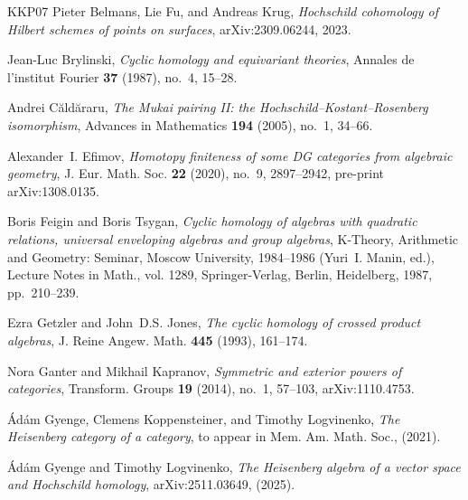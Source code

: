 \documentclass[12pt,a4paper,reqno]{amsart}
\begin{document}
\begin{thebibliography}{KKP07}
Pieter Belmans, Lie Fu, and Andreas Krug, \emph{Hochschild cohomology of
  {H}ilbert schemes of points on surfaces}, arXiv:2309.06244, 2023.

Jean-Luc Brylinski, \emph{Cyclic homology and equivariant theories}, Annales de
  l'institut Fourier \textbf{37} (1987), no.~4, 15--28.

Andrei Căldăraru, \emph{The {M}ukai pairing {II}: the
  {H}ochschild--{K}ostant--{R}osenberg isomorphism}, Advances in Mathematics
  \textbf{194} (2005), no.~1, 34--66.

Alexander~I. Efimov, \emph{Homotopy finiteness of some {DG} categories from
  algebraic geometry}, J. Eur. Math. Soc. \textbf{22} (2020), no.~9,
  2897--2942, pre-print arXiv:1308.0135.

Boris Feigin and Boris Tsygan, \emph{Cyclic homology of algebras with quadratic
  relations, universal enveloping algebras and group algebras}, K-Theory,
  Arithmetic and Geometry: Seminar, Moscow University, 1984--1986 (Yuri~I.
  Manin, ed.), Lecture Notes in Math., vol. 1289, Springer-Verlag, Berlin,
  Heidelberg, 1987, pp.~210--239.

Ezra Getzler and John~D.S. Jones, \emph{The cyclic homology of crossed product
  algebras}, J. Reine Angew. Math. \textbf{445} (1993), 161--174.

Nora Ganter and Mikhail Kapranov, \emph{Symmetric and exterior powers of
  categories}, Transform. Groups \textbf{19} (2014), no.~1, 57--103,
  arXiv:1110.4753.

{\'A}d{\'a}m Gyenge, Clemens Koppensteiner, and Timothy Logvinenko, \emph{The
  {H}eisenberg category of a category}, to appear in Mem. Am. Math. Soc.,
  (2021).

{\'A}d{\'a}m Gyenge and Timothy Logvinenko, \emph{The {H}eisenberg algebra of a
  vector space and {H}ochschild homology}, arXiv:2511.03649, (2025).


\end{thebibliography}
\end{document}
